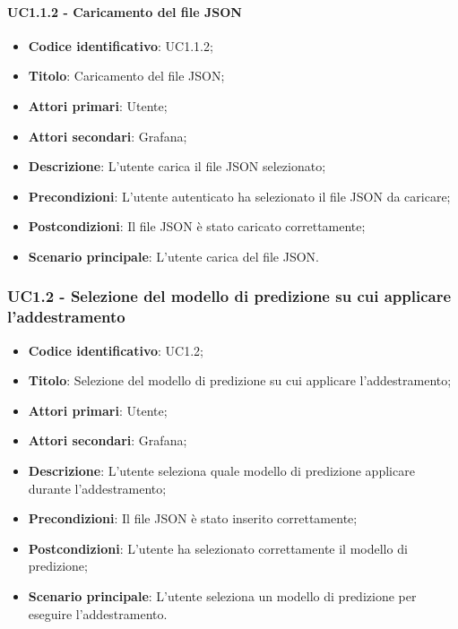 \paragraph{UC1.1.2 - Caricamento del file JSON}
\begin{itemize}
	\item \textbf{Codice identificativo}: UC1.1.2;
	\item \textbf{Titolo}: Caricamento del file JSON;
	\item \textbf{Attori primari}: Utente;
	\item \textbf{Attori secondari}: Grafana\glo;
	\item \textbf{Descrizione}: L'utente carica il file JSON selezionato;
	\item \textbf{Precondizioni}: L'utente autenticato ha selezionato il file JSON da caricare;
	\item \textbf{Postcondizioni}: Il file JSON è stato caricato correttamente;
	\item \textbf{Scenario principale}: L'utente carica del file JSON.
\end{itemize}

\subsubsection{UC1.2 - Selezione del modello di predizione su cui applicare l'addestramento}
\begin{itemize}
	\item \textbf{Codice identificativo}: UC1.2;
	\item \textbf{Titolo}: Selezione del modello di predizione su cui applicare l'addestramento;
	\item \textbf{Attori primari}: Utente;
	\item \textbf{Attori secondari}: Grafana\glo;
	\item \textbf{Descrizione}: L'utente seleziona quale modello di predizione applicare durante l'addestramento;
	\item \textbf{Precondizioni}: Il file JSON è stato inserito correttamente;
	\item \textbf{Postcondizioni}: L'utente ha selezionato correttamente il modello di predizione;
	\item \textbf{Scenario principale}: L'utente seleziona un modello di predizione per eseguire l'addestramento.
\end{itemize}

